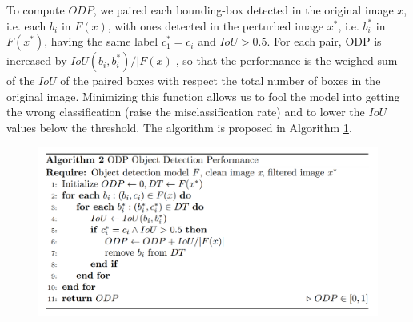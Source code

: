 To compute $ODP$, we paired each bounding-box detected in the original image $x$, i.e. each $b_i$ in $F(x)$, with ones detected in the perturbed image $x^*$, i.e. $b^*_i$ in $F(x^*)$, having the same label $c^*_1=c_i$ and $IoU> 0.5$.
For each pair, ODP is increased by $IoU(b_i,b^*_i)/\vert F(x)\vert$, so that the performance is the weighed sum of the $IoU$ of the paired boxes with respect the total number of boxes in the original image.
Minimizing this function allows us to fool the model into getting the wrong classification (raise the misclassification rate) and to lower the $IoU$ values below the threshold. The algorithm is proposed  in Algorithm \ref{algODP}.



\begin{figure}[ht]
\centering
    \includegraphics[width=1.0\textwidth]{Attack/charts/odp_alg.png}
    \caption{}
    \label{algODP}
     
\end{figure}

